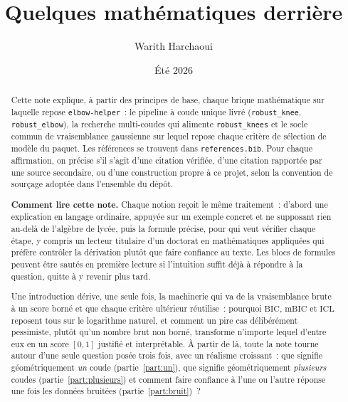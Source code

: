 \documentclass[11pt]{article}
\title{Quelques mathématiques derrière \code{elbow-helper}}
\author{Warith Harchaoui}
\date{Été 2026}
\newcommand{\code}[1]{\texttt{#1}}
\begin{document}
\maketitle

\begin{abstract}
Cette note explique, à partir des principes de base, chaque brique
mathématique sur laquelle repose \code{elbow-helper}~: le pipeline à coude
unique livré (\code{robust\_knee}, \code{robust\_elbow}), la recherche
multi-coudes qui alimente \code{robust\_knees} et le socle commun de
vraisemblance gaussienne sur lequel repose chaque critère de sélection de
modèle du paquet. Les références se trouvent dans \code{references.bib}.
Pour chaque affirmation, on précise s'il s'agit d'une citation vérifiée,
d'une citation rapportée par une source secondaire, ou d'une construction
propre à ce projet, selon la convention de sourçage adoptée dans
l'ensemble du dépôt.

\textbf{Comment lire cette note.} Chaque notion reçoit le même traitement~:
d'abord une explication en langage ordinaire, appuyée sur un exemple
concret et ne supposant rien au-delà de l'algèbre de lycée, puis la formule
précise, pour qui veut vérifier chaque étape, y compris un lecteur
titulaire d'un doctorat en mathématiques appliquées qui préfère contrôler
la dérivation plutôt que faire confiance au texte. Les blocs de formules
peuvent être sautés en première lecture si l'intuition suffit déjà à
répondre à la question, quitte à y revenir plus tard.

Une introduction dérive, une seule fois, la machinerie qui va de la
vraisemblance brute à un score borné et que chaque critère ultérieur
réutilise~: pourquoi $\mathrm{BIC}$, $\mathrm{mBIC}$ et $\mathrm{ICL}$
reposent tous sur le logarithme naturel, et comment un pire cas
délibérément pessimiste, plutôt qu'un nombre brut non borné, transforme
n'importe lequel d'entre eux en un score $[0,1]$ justifié et
interprétable. À partir de là, toute la note tourne autour d'une seule
question posée trois fois, avec un réalisme croissant~: que signifie
géométriquement \emph{un} coude (partie~\ref{part:un}), que signifie
géométriquement \emph{plusieurs} coudes (partie~\ref{part:plusieurs}) et
comment faire confiance à l'une ou l'autre réponse une fois les données
bruitées (partie~\ref{part:bruit})~?
\end{abstract}

\clearpage

\tableofcontents

\clearpage
\end{document}

